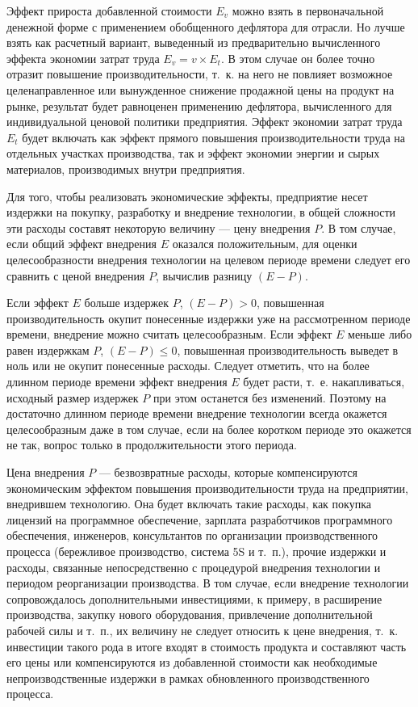 \documentclass{article}
\begin{document}
Эффект прироста добавленной стоимости $E_v$ можно взять в первоначальной денежной форме с применением обобщенного дефлятора для отрасли. Но лучше взять как расчетный вариант, выведенный из предварительно вычисленного эффекта экономии затрат труда $E_v = v \times E_t$. В этом случае он более точно отразит повышение производительности, т.~к. на него не повлияет возможное целенаправленное или вынужденное снижение продажной цены на продукт на рынке, результат будет равноценен применению дефлятора, вычисленного для индивидуальной ценовой политики предприятия. Эффект экономии затрат труда $E_t$ будет включать как эффект прямого повышения производительности труда на отдельных участках производства, так и эффект экономии энергии и сырых материалов, производимых внутри предприятия.

Для того, чтобы реализовать экономические эффекты, предприятие несет издержки на покупку, разработку и внедрение технологии, в общей сложности эти расходы составят некоторую величину — цену внедрения $P$. В том случае, если общий эффект внедрения $E$ оказался положительным, для оценки целесообразности внедрения технологии на целевом периоде времени следует его сравнить с ценой внедрения $P$, вычислив разницу $(E - P)$.

Если эффект $E$ больше издержек $P$, $(E - P) > 0$, повышенная производительность окупит понесенные издержки уже на рассмотренном периоде времени, внедрение можно считать целесообразным. Если эффект $E$ меньше либо равен издержкам $P$, $(E - P) \le 0$, повышенная производительность выведет в ноль или не окупит понесенные расходы. Следует отметить, что на более длинном периоде времени эффект внедрения $E$ будет расти, т.~е. накапливаться, исходный размер издержек $P$ при этом останется без изменений. Поэтому на достаточно длинном периоде времени внедрение технологии всегда окажется целесообразным даже в том случае, если на более коротком периоде это окажется не так, вопрос только в продолжительности этого периода.

Цена внедрения $P$ — безвозвратные расходы, которые компенсируются экономическим эффектом повышения производительности труда на предприятии, внедрившем технологию. Она будет включать такие расходы, как покупка лицензий на программное обеспечение, зарплата разработчиков программного обеспечения, инженеров, консультантов по организации производственного процесса (бережливое производство, система 5S и т.~п.), прочие издержки и расходы, связанные непосредственно с процедурой внедрения технологии и периодом реорганизации производства. В том случае, если внедрение технологии сопровождалось дополнительными инвестициями, к примеру, в расширение производства, закупку нового оборудования, привлечение дополнительной рабочей силы и т.~п., их величину не следует относить к цене внедрения, т.~к. инвестиции такого рода в итоге входят в стоимость продукта и составляют часть его цены или компенсируются из добавленной стоимости как необходимые непроизводственные издержки в рамках обновленного производственного процесса.
\end{document}
